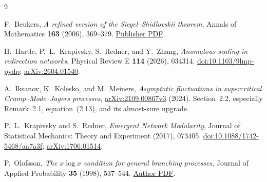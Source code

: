 \documentclass[11pt]{article}
\theoremstyle{definition}
\theoremstyle{remark}
\numberwithin{equation}{section}
\begin{document}
\begin{thebibliography}{9}

F.~Beukers,
\emph{A refined version of the Siegel--Shidlovskii theorem},
Annals of Mathematics \textbf{163} (2006), 369--379.
\href{https://annals.math.princeton.edu/wp-content/uploads/annals-v163-n1-p08.pdf}{Publisher PDF}.

H.~Hartle, P.~L.~Krapivsky, S.~Redner, and Y.~Zhang,
\emph{Anomalous scaling in redirection networks},
Physical Review E \textbf{114} (2026), 034314.
\href{https://doi.org/10.1103/9lmp-pydp}{doi:10.1103/9lmp-pydp};
\href{https://arxiv.org/abs/2604.01540}{arXiv:2604.01540}.

A.~Iksanov, K.~Kolesko, and M.~Meiners,
\emph{Asymptotic fluctuations in supercritical Crump--Mode--Jagers processes},
\href{https://arxiv.org/abs/2109.00867v3}{arXiv:2109.00867v3} (2024).
Section~2.2, especially Remark~2.1, equation~(2.13), and its
almost-sure upgrade.

P.~L.~Krapivsky and S.~Redner,
\emph{Emergent Network Modularity},
Journal of Statistical Mechanics: Theory and Experiment (2017), 073405.
\href{https://doi.org/10.1088/1742-5468/aa7a3f}{doi:10.1088/1742-5468/aa7a3f};
\href{https://arxiv.org/abs/1706.01514}{arXiv:1706.01514}.

P.~Olofsson,
\emph{The $x\log x$ condition for general branching processes},
Journal of Applied Probability \textbf{35} (1998), 537--544.
\href{https://www.stat.rice.edu/~olofsson/xlogx.pdf}{Author PDF}.

\end{thebibliography}
\end{document}
